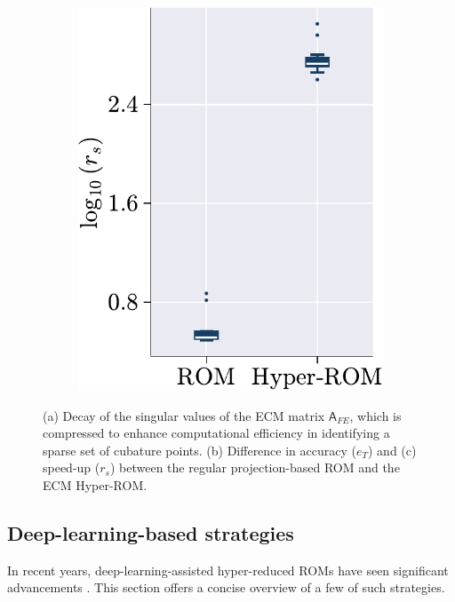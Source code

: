 \documentclass[11pt]{article}
\newcommand{\mat}[1]{\mathsf{#1}}
\begin{document}
\begin{figure}[t!]
\begin{subfigure}[b]{0.33\linewidth}
                    \includegraphics[height=1.3\linewidth]{speed_up_comp_rom_hrom_ecm.pdf}
                    \caption{}
                    \label{fig:HROM_ERROR_SPDUP__ecm_b}
                \end{subfigure}
                \caption{(a) Decay of the singular values of the ECM matrix \(\mat{A}_{FE}\), which is compressed to enhance computational efficiency in identifying a sparse set of cubature points. (b) Difference in accuracy (\(e_T\)) and (c) speed-up (\(r_s\)) between the regular projection-based ROM and the ECM Hyper-ROM.}
                \label{fig:HROM_ERROR_SPDUP_ecm}
            \end{figure}




            \subsection{Deep-learning-based strategies}

            In recent years, deep-learning-assisted hyper-reduced ROMs have seen significant advancements \cite{cicci2022deep-hyromneta,romor2025explicable}.
            This section offers a concise overview of a few of such strategies.
\end{document}
